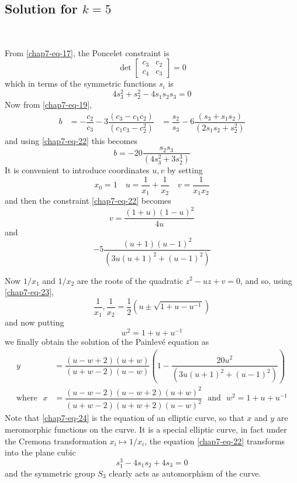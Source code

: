 \subsection{Solution for \boldmath$k=5$}\label{chap7-subsec-6.3}
~

\smallskip
\noindent
From \eqref{chap7-eq-17}, the Poncelet constraint is
$$
\det
\begin{bmatrix}
c_{3} & c_{2}\\
c_{4} & c_{3}
\end{bmatrix}
=0
$$
which in terms of the symmetric functions $s_{i}$ is
\begin{equation*}\label{chap7-eq-22}
4s_{3}^{2} +s_{2}^{2} - 4s_{1}s_{2}s_{3} =0\tag{22}
\end{equation*}
Now from \eqref{chap7-eq-19},
\begin{align*}
b &= -\dfrac{c_{2}}{c_{3}} -3 \dfrac{(c_{3}-c_{1}c_{2})}{(c_{1}c_{3}-c_{2}^{2})}
 &=\dfrac{s_{2}}{s_{3}} -6\dfrac{(s_{3}+s_{1}s_{2})}{(2s_{1}s_{2}+s_{2}^{2})}
\end{align*}\pageoriginale
and using \eqref{chap7-eq-22} this becomes
$$
b =-20 \dfrac{s_{2}s_{3}}{(4s_{3}^{2} + 3s_{2}^{3})}
$$
It is convenient to introduce coordinates $u, v$ by setting
$$
x_{0}=1 \quad  u=\dfrac{1}{x_{1}} + \dfrac{1}{x_{2}} \quad v= \dfrac{1}{x_{1}x_{2}}
$$
and then the constraint \eqref{chap7-eq-22} becomes
\begin{equation*}\label{chap7-eq-23}
v = \dfrac{(1+u)(1-u)^{2}}{4u}\tag{23}
\end{equation*}
and
$$
-5\dfrac{(u+1)(u-1)^{2}}{(3u(u+1)^{2} + (u-1)^{2})}
$$

Now $1/x_{1}$ and $1/x_{2}$ are the roots of the quadratic $z^{2}-uz +v =0$, and so, using \eqref{chap7-eq-23},
$$
\dfrac{1}{x_{1}}, \dfrac{1}{x_{2}} = \dfrac{1}{2}(u \pm \sqrt{1+u-u^{-1}})
$$
and now putting
\begin{equation*}\label{chap7-eq-24}
w^{2} = 1+u +u^{-1}\tag{24}
\end{equation*}
we finally obtain the solution of the Painlev\'e equation as
\begin{align*}
y &=  \dfrac{(u-w+2)(u+w)}{(u+w-2)(u-w)} \left(1- \dfrac{20u^{2}}{(3u(u+1)^{2} + (u-1)^{2})} \right)\\
\text{where~~}  x &= \dfrac{(u-w-2)(u-w+2)(u+w)^{2}}{(u+w-2)(u+w+2)(u-w)^{2}}\text{~ and~ }  w^{2}=1+u+u^{-1}
\end{align*}
Note that \eqref{chap7-eq-24} is the equation of an elliptic curve, so that $x$ and $y$ are meromorphic functions on the curve. It is a special elliptic curve, in fact under the Cremona transformation $x_{i}\mapsto 1/x_{i}$, the equation \eqref{chap7-eq-22} transforms into the plane cubic
$$
s_{1}^{3}-4s_{1}s_{2}+4s_{3} =0
$$
and the symmetric group $S_{3}$ clearly acts as automorphism of the curve.


